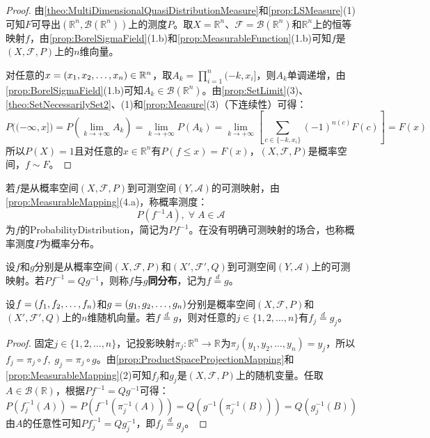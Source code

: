 \begin{proof}
	由\cref{theo:MultiDimensionalQuasiDistributionMeasure}和\cref{prop:LSMeasure}(1)可知$F$可导出$(\mathbb{R}^{n},\mathcal{B}(\mathbb{R}^{n}))$上的测度$P$。取$X=\mathbb{R}^{n}$、$\mathscr{F}=\mathcal{B}(\mathbb{R}^{n})$和$\mathbb{R}^{n}$上的恒等映射$f$，由\cref{prop:BorelSigmaField}(1.b)和\cref{prop:MeasurableFunction}(1.b)可知$f$是$(X,\mathscr{F},P)$上的$n$维向量。\par
	对任意的$x=(x_1, x_2, \dots, x_{n})\in\mathbb{R}^{n}$，取$A_k=\prod_{i=1}^{n}(-k,x_i]$，则$A_k$单调递增，由\cref{prop:BorelSigmaField}(1.b)可知$A_k\in\mathcal{B}(\mathbb{R}^{n})$。由\cref{prop:SetLimit}(3)、\cref{theo:SetNecessarilySet2}、(1)和\cref{prop:Measure}(3)（下连续性）可得：
	\begin{equation*}
		P\Big((-\infty,x]\Big)=P\left(\lim_{k\to+\infty}A_k\right)=\lim_{k\to+\infty}P(A_k)=\lim_{k\to+\infty}\left[\sum_{c\in\{-k,x_i\}}(-1)^{n(c)}F(c)\right]=F(x)
	\end{equation*}
	所以$P(X)=1$且对任意的$x\in\mathbb{R}^{n}$有$P(f\leqslant x)=F(x)$，$(X,\mathscr{F},P)$是概率空间，$f\sim F$。
\end{proof}
\begin{definition}
	若$f$是从概率空间$(X,\mathscr{F},P)$到可测空间$(Y,\mathscr{A})$的可测映射，由\cref{prop:MeasurableMapping}(4.a)，称概率测度：
	\begin{equation*}
		P(f^{-1}A),\;\forall\;A\in\mathscr{A}
	\end{equation*}
	为$f$的\gls{ProbabilityDistribution}，简记为$Pf^{-1}$。在没有明确可测映射的场合，也称概率测度$P$为概率分布。
\end{definition}
\begin{definition}
	设$f$和$g$分别是从概率空间$(X,\mathscr{F},P)$和$(X',\mathscr{F}',Q)$到可测空间$(Y,\mathscr{A})$上的可测映射。若$Pf^{-1}=Qg^{-1}$，则称$f$与$g$\textbf{同分布}，记为$f\overset{d}{=}g$。
\end{definition}
\begin{property}\label{prop:IdenticallyDistributedCoordinates}
	设$f=(f_1, f_2, \dots, f_{n})$和$g=(g_1, g_2, \dots, g_{n})$分别是概率空间$(X,\mathscr{F},P)$和$(X',\mathscr{F}',Q)$上的$n$维随机向量。若$f\overset{d}{=}g$，则对任意的$j\in\{1,2,\dots,n\}$有$f_j\overset{d}{=}g_j$。
\end{property}
\begin{proof}
	固定$j\in\{1,2,\dots,n\}$，记投影映射$\pi_j:\mathbb{R}^{n}\to\mathbb{R}^{}$为$\pi_j(y_1,y_2,\dots,y_n)=y_j$，所以$f_j=\pi_j\circ f,\;g_j=\pi_j\circ g$。由\cref{prop:ProductSpaceProjectionMapping}和\cref{prop:MeasurableMapping}(2)可知$f_j$和$g_j$是$(X,\mathscr{F},P)$上的随机变量。任取$A\in\mathcal{B}(\mathbb{R})$，根据$Pf^{-1}=Qg^{-1}$可得：
	\begin{equation*}
		P(f_j^{-1}(A))=P\left(f^{-1}(\pi_j^{-1}(A))\right)=Q\left(g^{-1}(\pi_j^{-1}(B))\right)=Q(g_j^{-1}(B))
	\end{equation*}
	由$A$的任意性可知$Pf_j^{-1}=Qg_j^{-1}$，即$f_j\overset{d}{=}g_j$。
\end{proof}

